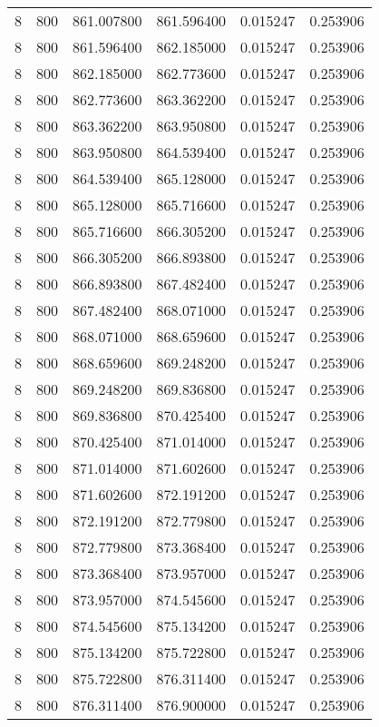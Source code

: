 \begin{longtable}{rrrrrr}
8 & 800 & 861.007800 & 861.596400 & 0.015247 & 0.253906 \\
8 & 800 & 861.596400 & 862.185000 & 0.015247 & 0.253906 \\
8 & 800 & 862.185000 & 862.773600 & 0.015247 & 0.253906 \\
8 & 800 & 862.773600 & 863.362200 & 0.015247 & 0.253906 \\
8 & 800 & 863.362200 & 863.950800 & 0.015247 & 0.253906 \\
8 & 800 & 863.950800 & 864.539400 & 0.015247 & 0.253906 \\
8 & 800 & 864.539400 & 865.128000 & 0.015247 & 0.253906 \\
8 & 800 & 865.128000 & 865.716600 & 0.015247 & 0.253906 \\
8 & 800 & 865.716600 & 866.305200 & 0.015247 & 0.253906 \\
8 & 800 & 866.305200 & 866.893800 & 0.015247 & 0.253906 \\
8 & 800 & 866.893800 & 867.482400 & 0.015247 & 0.253906 \\
8 & 800 & 867.482400 & 868.071000 & 0.015247 & 0.253906 \\
8 & 800 & 868.071000 & 868.659600 & 0.015247 & 0.253906 \\
8 & 800 & 868.659600 & 869.248200 & 0.015247 & 0.253906 \\
8 & 800 & 869.248200 & 869.836800 & 0.015247 & 0.253906 \\
8 & 800 & 869.836800 & 870.425400 & 0.015247 & 0.253906 \\
8 & 800 & 870.425400 & 871.014000 & 0.015247 & 0.253906 \\
8 & 800 & 871.014000 & 871.602600 & 0.015247 & 0.253906 \\
8 & 800 & 871.602600 & 872.191200 & 0.015247 & 0.253906 \\
8 & 800 & 872.191200 & 872.779800 & 0.015247 & 0.253906 \\
8 & 800 & 872.779800 & 873.368400 & 0.015247 & 0.253906 \\
8 & 800 & 873.368400 & 873.957000 & 0.015247 & 0.253906 \\
8 & 800 & 873.957000 & 874.545600 & 0.015247 & 0.253906 \\
8 & 800 & 874.545600 & 875.134200 & 0.015247 & 0.253906 \\
8 & 800 & 875.134200 & 875.722800 & 0.015247 & 0.253906 \\
8 & 800 & 875.722800 & 876.311400 & 0.015247 & 0.253906 \\
8 & 800 & 876.311400 & 876.900000 & 0.015247 & 0.253906 \\

\end{longtable}
